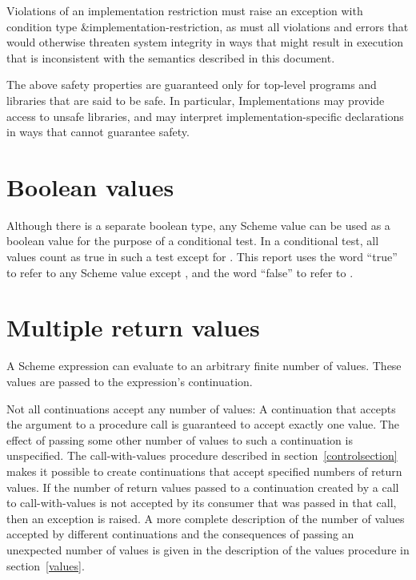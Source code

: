 Violations of an implementation restriction must raise an
exception with condition type {\cf\&implementation-restriction},
as must all
violations and errors that would otherwise threaten system
integrity in ways that might result in execution that is
inconsistent with the semantics described in this document.

The above safety properties are guaranteed only for top-level programs
and libraries that are said to be safe.  In particular, Implementations
may provide access to unsafe libraries, and may interpret
implementation-specific declarations in ways that
cannot guarantee safety.

\section{Boolean values}
\label{booleanvaluessection}

Although there is a separate boolean type, any Scheme value can be
used as a boolean value for the purpose of a conditional test.  In a
conditional test, all values count as true in such a test except for
\schfalse{}.  This report uses the word ``true'' to refer to any
Scheme value except \schfalse{}, and the word ``false'' to refer to
\schfalse{}.  

\section{Multiple return values}
\label{multiplereturnvaluessection}

A Scheme expression can evaluate to an arbitrary finite number of
values.  These values are passed to the expression's continuation.

Not all continuations accept any number of values: A continuation that
accepts the argument to a procedure call is guaranteed to accept
exactly one value.  The effect of passing some other number of values
to such a continuation is unspecified.  The {\cf call-with-values}
procedure
described in section~\ref{controlsection} makes it possible to create
continuations that accept specified numbers of return values.
If the number of
return values passed to a continuation created by a call to
{\cf call-with-values} is not accepted by its consumer
that was passed in that call, then an exception is raised.
A more complete description of the number of values accepted by
different continuations and the consequences of passing an unexpected
number of values is given in the description of the {\cf values}
procedure in section~\ref{values}.

